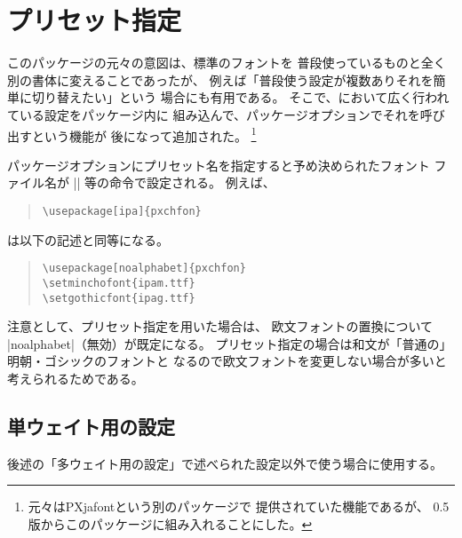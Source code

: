 \documentclass[uplatex,dvipdfmx,a4paper]{jsarticle}
\newcommand{\Pkg}[1]{\textsf{#1}}
\begin{document}
\section{プリセット指定}
\label{sec:Preset}

このパッケージの元々の意図は、標準のフォントを
普段使っているものと全く別の書体に変えることであったが、
例えば「普段使う設定が複数ありそれを簡単に切り替えたい」という
場合にも有用である。
そこで、{\pTeX}において広く行われている設定をパッケージ内に
組み込んで、パッケージオプションでそれを呼び出すという機能が
後になって追加された。
\footnote{元々は\Pkg{PXjafont}という別のパッケージで
提供されていた機能であるが、
0.5版からこのパッケージに組み入れることにした。}

パッケージオプションにプリセット名を指定すると予め決められたフォント
ファイル名が |\setminchofont| 等の命令で設定される。
例えば、
\begin{quote}\small\begin{verbatim}
\usepackage[ipa]{pxchfon}
\end{verbatim}\end{quote}
は以下の記述と同等になる。
\begin{quote}\small\begin{verbatim}
\usepackage[noalphabet]{pxchfon}
\setminchofont{ipam.ttf}
\setgothicfont{ipag.ttf}
\end{verbatim}\end{quote}

注意として、プリセット指定を用いた場合は、
欧文フォントの置換について |noalphabet|（無効）が既定になる。
プリセット指定の場合は和文が「普通の」明朝・ゴシックのフォントと
なるので欧文フォントを変更しない場合が多いと考えられるためである。

\subsection{単ウェイト用の設定}

後述の「多ウェイト用の設定」で述べられた設定以外で使う場合に使用する。
\end{document}
